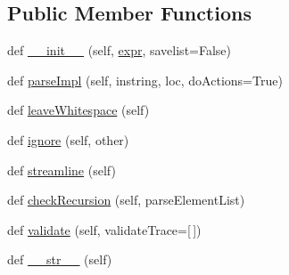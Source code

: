 \subsection*{Public Member Functions}
\begin{DoxyCompactItemize}
\item 
def \hyperlink{classsetuptools_1_1__vendor_1_1pyparsing_1_1ParseElementEnhance_ae3f786d98e549890d0d9d625abd8fbe6}{\+\_\+\+\_\+init\+\_\+\+\_\+} (self, \hyperlink{classsetuptools_1_1__vendor_1_1pyparsing_1_1ParseElementEnhance_a445450bd765a74cc1d1567e40cade40d}{expr}, savelist=False)
\item 
def \hyperlink{classsetuptools_1_1__vendor_1_1pyparsing_1_1ParseElementEnhance_af1670974a0c2e5ea37e19941e28dfec9}{parse\+Impl} (self, instring, loc, do\+Actions=True)
\item 
def \hyperlink{classsetuptools_1_1__vendor_1_1pyparsing_1_1ParseElementEnhance_ae27d44da67f440c5272be6ad3ae080b0}{leave\+Whitespace} (self)
\item 
def \hyperlink{classsetuptools_1_1__vendor_1_1pyparsing_1_1ParseElementEnhance_a875f69cc8c08a3e2d92242cd58fae173}{ignore} (self, other)
\item 
def \hyperlink{classsetuptools_1_1__vendor_1_1pyparsing_1_1ParseElementEnhance_a1db9880ce466b1acb3a78e4c11cd82b6}{streamline} (self)
\item 
def \hyperlink{classsetuptools_1_1__vendor_1_1pyparsing_1_1ParseElementEnhance_ab715c1325eac2f7815c4db6afd6b7fe2}{check\+Recursion} (self, parse\+Element\+List)
\item 
def \hyperlink{classsetuptools_1_1__vendor_1_1pyparsing_1_1ParseElementEnhance_a70e4a0d7327720444d26654ee616e35d}{validate} (self, validate\+Trace=\mbox{[}$\,$\mbox{]})
\item 
def \hyperlink{classsetuptools_1_1__vendor_1_1pyparsing_1_1ParseElementEnhance_a5d4e2c0d4039666f4e951f9560e0c25d}{\+\_\+\+\_\+str\+\_\+\+\_\+} (self)
\end{DoxyCompactItemize}
